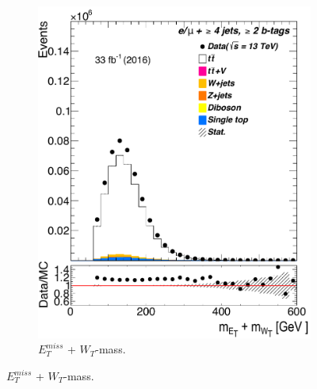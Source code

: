 \begin{figure} [b]
\begin{subfigure}{0.25\textwidth}
\includegraphics[width=\linewidth]{ControlPlots_emujets_2016_4incl_2incl/met_plus_mtw_emujets_2016.pdf}
\caption{$E_T^{miss}$ + $W_T$-mass.} \label{fig:Sec3}
\end{subfigure}
	

\end{figure}
